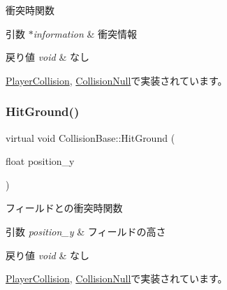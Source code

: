 衝突時関数 


\begin{DoxyParams}{引数}
{\em $\ast$information} & 衝突情報 \\
\hline
\end{DoxyParams}

\begin{DoxyRetVals}{戻り値}
{\em void} & なし \\
\hline
\end{DoxyRetVals}


\mbox{\hyperlink{class_player_collision_aed2775b2a14b6868160d6668ed928f8d}{Player\+Collision}}, \mbox{\hyperlink{class_collision_null_ad3473329f7af1b86ea6dfc1c4e8e81c1}{Collision\+Null}}で実装されています。

\mbox{\label{class_collision_base_a48c9d1d9e4286cde5054d4d2aa70bdd8}} 
\subsubsection{\texorpdfstring{Hit\+Ground()}{HitGround()}}
{\footnotesize\ttfamily virtual void Collision\+Base\+::\+Hit\+Ground (\begin{DoxyParamCaption}\item[{float}]{position\+\_\+y }\end{DoxyParamCaption})\hspace{0.3cm}{\ttfamily [pure virtual]}}



フィールドとの衝突時関数 


\begin{DoxyParams}{引数}
{\em position\+\_\+y} & フィールドの高さ \\
\hline
\end{DoxyParams}

\begin{DoxyRetVals}{戻り値}
{\em void} & なし \\
\hline
\end{DoxyRetVals}


\mbox{\hyperlink{class_player_collision_a3522ce17b1e1752f2737c2243582ecb0}{Player\+Collision}}, \mbox{\hyperlink{class_collision_null_ac5645bca5f03262d1918e2ff8348440d}{Collision\+Null}}で実装されています。

\mbox{\label{class_collision_base_a5d59d851904725f6301bebd2b952c49c}} 
